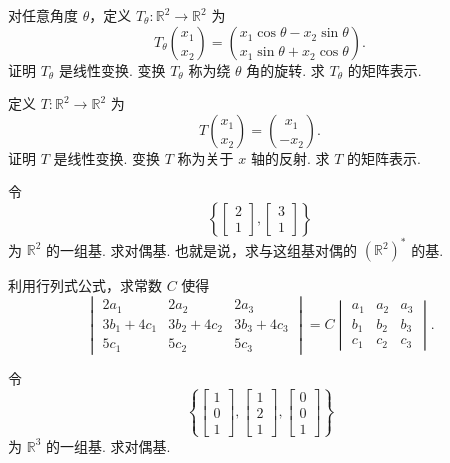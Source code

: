 \begin{question}\label{q:1-34}
对任意角度 $\theta$，定义 $T_\theta:\mathbb{R}^2\to\mathbb{R}^2$ 为
\[
T_\theta\binom{x_1}{x_2}=\binom{x_1\cos\theta-x_2\sin\theta}{x_1\sin\theta+x_2\cos\theta}.
\]
证明 $T_\theta$ 是线性变换. 变换 $T_\theta$ 称为绕 $\theta$ 角的旋转. 求 $T_\theta$ 的矩阵表示.
\end{question}

\begin{question}\label{q:1-35}
定义 $T:\mathbb{R}^2\to\mathbb{R}^2$ 为
\[
T\binom{x_1}{x_2}=\binom{x_1}{-x_2}.
\]
证明 $T$ 是线性变换. 变换 $T$ 称为关于 $x$ 轴的反射. 求 $T$ 的矩阵表示.
\end{question}

\begin{question}\label{q:1-36}
令
\[
\left\{\begin{bmatrix}2\\1\end{bmatrix},\begin{bmatrix}3\\1\end{bmatrix}\right\}
\]
为 $\mathbb{R}^2$ 的一组基. 求对偶基. 也就是说，求与这组基对偶的 $(\mathbb{R}^2)^*$ 的基.
\end{question}

\begin{question}\label{q:1-37}
利用行列式公式，求常数 $C$ 使得
\[
\begin{vmatrix}2a_1&2a_2&2a_3\\3b_1+4c_1&3b_2+4c_2&3b_3+4c_3\\5c_1&5c_2&5c_3\end{vmatrix}
=C\begin{vmatrix}a_1&a_2&a_3\\b_1&b_2&b_3\\c_1&c_2&c_3\end{vmatrix}.
\]
\end{question}

\begin{question}\label{q:1-38}
令
\[
\left\{\begin{bmatrix}1\\0\\1\end{bmatrix},\begin{bmatrix}1\\2\\1\end{bmatrix},\begin{bmatrix}0\\0\\1\end{bmatrix}\right\}
\]
为 $\mathbb{R}^3$ 的一组基. 求对偶基.
\end{question}

